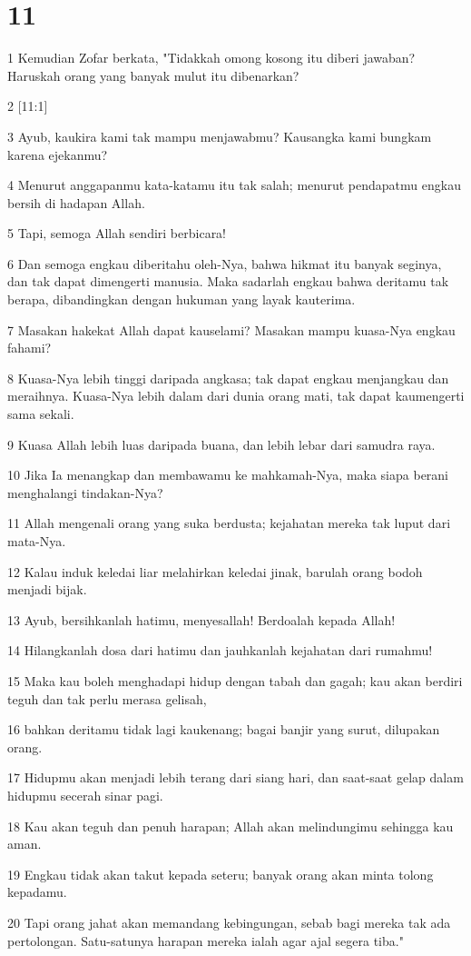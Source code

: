 \chapter{11}

\par 1 Kemudian Zofar berkata, "Tidakkah omong kosong itu diberi jawaban? Haruskah orang yang banyak mulut itu dibenarkan?
\par 2 [11:1]
\par 3 Ayub, kaukira kami tak mampu menjawabmu? Kausangka kami bungkam karena ejekanmu?
\par 4 Menurut anggapanmu kata-katamu itu tak salah; menurut pendapatmu engkau bersih di hadapan Allah.
\par 5 Tapi, semoga Allah sendiri berbicara!
\par 6 Dan semoga engkau diberitahu oleh-Nya, bahwa hikmat itu banyak seginya, dan tak dapat dimengerti manusia. Maka sadarlah engkau bahwa deritamu tak berapa, dibandingkan dengan hukuman yang layak kauterima.
\par 7 Masakan hakekat Allah dapat kauselami? Masakan mampu kuasa-Nya engkau fahami?
\par 8 Kuasa-Nya lebih tinggi daripada angkasa; tak dapat engkau menjangkau dan meraihnya. Kuasa-Nya lebih dalam dari dunia orang mati, tak dapat kaumengerti sama sekali.
\par 9 Kuasa Allah lebih luas daripada buana, dan lebih lebar dari samudra raya.
\par 10 Jika Ia menangkap dan membawamu ke mahkamah-Nya, maka siapa berani menghalangi tindakan-Nya?
\par 11 Allah mengenali orang yang suka berdusta; kejahatan mereka tak luput dari mata-Nya.
\par 12 Kalau induk keledai liar melahirkan keledai jinak, barulah orang bodoh menjadi bijak.
\par 13 Ayub, bersihkanlah hatimu, menyesallah! Berdoalah kepada Allah!
\par 14 Hilangkanlah dosa dari hatimu dan jauhkanlah kejahatan dari rumahmu!
\par 15 Maka kau boleh menghadapi hidup dengan tabah dan gagah; kau akan berdiri teguh dan tak perlu merasa gelisah,
\par 16 bahkan deritamu tidak lagi kaukenang; bagai banjir yang surut, dilupakan orang.
\par 17 Hidupmu akan menjadi lebih terang dari siang hari, dan saat-saat gelap dalam hidupmu secerah sinar pagi.
\par 18 Kau akan teguh dan penuh harapan; Allah akan melindungimu sehingga kau aman.
\par 19 Engkau tidak akan takut kepada seteru; banyak orang akan minta tolong kepadamu.
\par 20 Tapi orang jahat akan memandang kebingungan, sebab bagi mereka tak ada pertolongan. Satu-satunya harapan mereka ialah agar ajal segera tiba."

